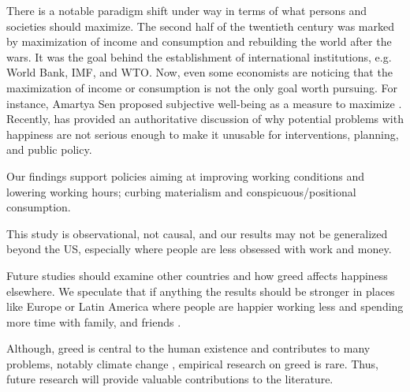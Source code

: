 \documentclass[10pt, letterpaper]{article}
\begin{document}
\begin{spacing}{1.8}
There is a notable paradigm shift under way in terms of what persons and
societies should maximize. The second half of the twentieth century was marked
by maximization of income and consumption and rebuilding the world after the
wars. It was the goal behind the establishment of international institutions,
e.g. World Bank, IMF, and WTO. Now, even some economists are noticing that the maximization of income or consumption is not the only goal worth pursuing. For instance, Amartya Sen proposed subjective well-being as a measure to maximize \cite{stiglitz09al}. 
Recently, \citet{diener09} has provided an authoritative  
discussion of why potential problems with happiness are not serious enough to make it unusable for interventions, planning, and public policy.  

Our findings support policies aiming at improving working conditions and lowering working hours; curbing materialism and conspicuous/positional consumption. 

This study is observational, not causal, and our results may not be generalized beyond the US, especially where people are less obsessed with work and money. 

Future studies should examine other countries and how greed affects happiness elsewhere. We speculate that if anything the results should be stronger in places like Europe or Latin America where people are happier working less and spending more time with family, and friends \citep{valente16,valente15,aokditella}.  

Although, greed is central to the human existence and contributes to many problems, notably climate change \citep[e.g.,][]{okulicz19}, empirical research on greed is rare. Thus, future research will provide valuable contributions to the literature. 



\end{spacing}
\end{document}

